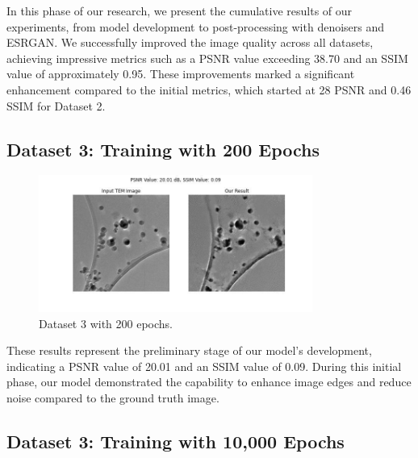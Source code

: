 \vspace{10pt}

In this phase of our research, we present the cumulative results of our experiments, from model development to post-processing with denoisers and ESRGAN. We successfully improved the image quality across all datasets, achieving impressive metrics such as a PSNR value exceeding 38.70 and an SSIM value of approximately 0.95. These improvements marked a significant enhancement compared to the initial metrics, which started at 28 PSNR and 0.46 SSIM for Dataset 2.


\subsection{Dataset 3: Training with 200 Epochs}

\begin{figure}[H]
    \centering
    \includegraphics[width=0.8\textwidth]{img/Dataset_3_with_200_epochs.jpg}
    \caption{Dataset 3 with 200 epochs.}\label{fig:Dataset_3_with_200_epochs.jpg}
\end{figure}

These results represent the preliminary stage of our model's development, indicating a PSNR value of 20.01 and an SSIM value of 0.09. During this initial phase, our model demonstrated the capability to enhance image edges and reduce noise compared to the ground truth image.

\subsection{Dataset 3: Training with 10,000 Epochs}


